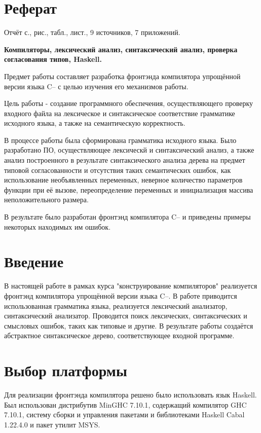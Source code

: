 \documentclass[a4paper,12pt]{report}
\numberwithin{equation}{section}
\begin{document}
 

\setcounter{page}{3}

\section*{Реферат}
Отчёт \pageref{LastPage}с., \totalfigures рис., \totaltables табл., \totallstlistings лист., 9 источников, 7 приложений.

\noindent \textbf{Компиляторы, лексический анализ, синтаксический анализ, проверка согласования типов, Haskell.} 

Предмет работы составляет разработка фронтэнда компилятора упрощённой версии языка C-- с целью изучения его механизмов работы.

Цель работы - создание программного обеспечения, осуществляющего проверку входного
файла на лексическое и синтаксическое соответствие грамматике исходного языка,
а также на семантическую корректность.

В процессе работы была сформирована грамматика исходного языка.
Было разработано ПО, осуществляющее лексическй и синтаксический анализ,
а также анализ построенного в результате синтаксического анализа дерева
на предмет типовой согласованности и отсутствия таких семантических ошибок,
как использование необъявленных переменных, неверное количество параметров функции при её вызове,
переопределение переменных и инициализация массива неположительного размера.

В результате было разработан фронтэнд компилятора C-- и приведены примеры некоторых находимых им ошибок.

\tableofcontents

\section{Введение}
В настоящей работе в рамках курса "конструирование компиляторов" реализуется фронтэнд компилятора упрощённой версии языка C--.
В работе приводится использованная грамматика языка, реализуется лексический анализатор, синтаксический анализатор.
Проводится поиск лексических, синтаксических и смысловых ошибок, таких как типовые и другие.
В результате работы создаётся абстрактное синтаксическое дерево, соответствующее входной программе.

\section{Выбор платформы}
Для реализации фронтэнда компилятора решено было использовать язык Haskell.
Был использован дистрибутив MinGHC 7.10.1\cite{minghc}, содержащий компилятор GHC 7.10.1\cite{ghc}, систему сборки и управления пакетами и библиотеками Haskell Cabal 1.22.4.0\cite{cabal} и пакет утилит MSYS\cite{msys}.
\end{document}
